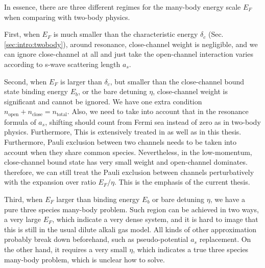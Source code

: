 In essence, there are three different regimes for the many-body energy scale $E_F$ when comparing with two-body physics.  

First, when $E_F$ is much smaller than the characteristic energy $\delta_c$ (Sec. \ref{sec:intro:twobody}), around resonance, close-channel weight is negligible, and we can ignore close-channel at all and just take the open-channel interaction varies according to s-wave scattering length $a_s$. 

Second, when $E_F$ is larger than $\delta_c$, but smaller than the close-channel bound state binding energy $E_b$, or the bare detuning $\eta$, close-channel weight is significant and cannot be ignored.  We have one extra condition $n_{\text{open}}+n_{\text{close}}=n_{\text{total}}$. Also, we need to take into account that in the resonance formula of $a_s$, shifting should count from Fermi sea instead of zero as in two-body physics.  Furthermore,  This is extensively treated in \cite{GurarieNarrow} as well as in this thesis.  Furthermore, Pauli exclusion between two channels needs to be taken into account when they share common species.  Nevertheless, in the low-momentum, close-channel bound state has very small weight and  open-channel dominates.  therefore, we can still treat the Pauli exclusion between channels perturbatively with the expansion over ratio $E_F/\eta$.  This is the emphasis of the current thesis.  

Third, when $E_F$ larger than binding energy $E_b$ or bare detuning $\eta$, we have a pure three species many-body problem. Such region can be achieved in two ways, a very large $E_F$, which indicate a very dense system, and it is hard to image that this is still in the usual dilute alkali gas model. All kinds of other approximation probably break down beforehand, such as pseudo-potential $a_s$ replacement. On the other hand, it requires a very small $\eta$, which indicates a true three species many-body problem, which is unclear how to solve.   